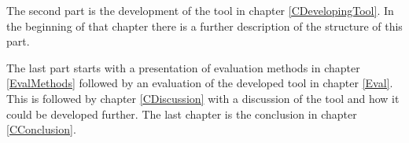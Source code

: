 The second part is the development of the tool in chapter \ref{CDevelopingTool}. In the beginning of that chapter there is a further description of the structure of this part. 

The last part starts with a presentation of evaluation methods in chapter \ref{EvalMethods} followed by an evaluation of the developed tool in chapter \ref{Eval}. This is followed by chapter \ref{CDiscussion} with a discussion of the tool and how it could be developed further. The last chapter is the conclusion in chapter \ref{CConclusion}. 

